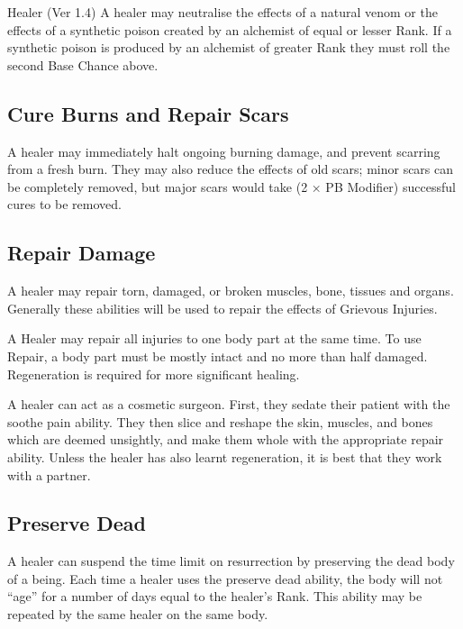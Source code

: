 \begin{Chapter}{Healer (Ver 1.4)}
A healer may neutralise the effects of a natural venom or the effects
of a synthetic poison created by an alchemist of equal or lesser Rank.
If a synthetic poison is produced by an alchemist of greater Rank they
must roll the second Base Chance above.

\subsection{Cure Burns and Repair Scars}

A healer may immediately halt ongoing burning damage, and prevent
scarring from a fresh burn.  They may also reduce the effects of old
scars; minor scars can be completely removed, but major scars would
take (2 × PB Modifier) successful cures to be removed.

\subsection{Repair Damage}

A healer may repair torn, damaged, or broken muscles, bone, tissues
and organs. Generally these abilities will be used to repair the
effects of Grievous Injuries.

A Healer may repair all injuries to one body part at the same time. To
use Repair, a body part must be mostly intact and no more than half
damaged.  Regeneration is required for more significant healing.

A healer can act as a cosmetic surgeon. First, they sedate their
patient with the soothe pain ability.  They then slice and reshape the
skin, muscles, and bones which are deemed unsightly, and make them
whole with the appropriate repair ability.  Unless the healer has also
learnt regeneration, it is best that they work with a partner.

\subsection{Preserve Dead}

A healer can suspend the time limit on resurrection by preserving the
dead body of a being. Each time a healer uses the preserve dead
ability, the body will not “age” for a number of days equal to the
healer’s Rank. This ability may be repeated by the same healer on the
same body.


\end{Chapter}
